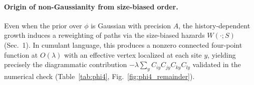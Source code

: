 \documentclass[12pt,a4paper]{article}
\begin{document}
\begin{table}[t]\centering
\caption{Comparison with related approaches (schematic).}
\label{tab:comparisons}
\end{table}

\paragraph{Origin of non-Gaussianity from size-biased order.}
Even when the prior over $\phi$ is Gaussian with precision $A$, the history-dependent growth
induces a reweighting of paths via the size-biased hazards $W(\cdot;S)$ (Sec.~1). In cumulant language,
this produces a nonzero connected four-point function at $O(\lambda)$ with an effective vertex localized
at each site $y$, yielding precisely the diagrammatic contribution $-\lambda\sum_y C_{iy}C_{jy}C_{ky}C_{ly}$
validated in the numerical check (Table~\ref{tab:phi4}, Fig.~\ref{fig:phi4_remainder}).


\end{document}
